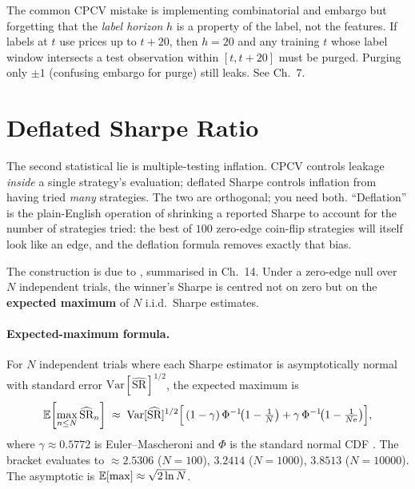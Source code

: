\begin{pitfallbox}
The common CPCV mistake is implementing combinatorial and embargo
but forgetting that the \emph{label horizon} $h$ is a property of
the label, not the features. If labels at $t$ use prices up to
$t + 20$, then $h = 20$ and any training $t$ whose label window
intersects a test observation within $[t, t+20]$ must be purged.
Purging only $\pm 1$ (confusing embargo for purge) still leaks.
See \citet{lopezdeprado2018afml} Ch.~7.
\end{pitfallbox}

\section{Deflated Sharpe Ratio}
\label{sec:bt_deflated_sharpe}

The second statistical lie is multiple-testing inflation. CPCV
controls leakage \emph{inside} a single strategy's evaluation;
deflated Sharpe controls inflation from having tried \emph{many}
strategies. The two are orthogonal; you need both. ``Deflation''
is the plain-English operation of shrinking a reported Sharpe to
account for the number of strategies tried: the best of $100$
zero-edge coin-flip strategies will itself look like an edge, and
the deflation formula removes exactly that bias.

The construction is due to \citet{bailey2014deflated}, summarised in
\citeAFML{} Ch.~14. Under a zero-edge null over $N$ independent
trials, the winner's Sharpe is centred not on zero but on the
\textbf{expected maximum} of $N$ i.i.d.\ Sharpe estimates.

\paragraph{Expected-maximum formula.} For $N$ independent trials
where each Sharpe estimator is asymptotically normal with standard
error $\text{Var}[\widehat{\text{SR}}]^{1/2}$, the expected
maximum is
\begin{equation}
\mathbb{E}\!\left[\max_{n \leq N} \widehat{\text{SR}}_n\right]
  \;\approx\;
  \text{Var}[\widehat{\text{SR}}]^{1/2}
  \Bigl[\,(1 - \gamma)\,\Phi^{-1}\!\bigl(1 - \tfrac{1}{N}\bigr)
       + \gamma\,\Phi^{-1}\!\bigl(1 - \tfrac{1}{N\mathrm{e}}\bigr)\Bigr],
  \label{eq:dsr_emax}
\end{equation}
where $\gamma \approx 0.5772$ is Euler--Mascheroni and $\Phi$ is the
standard normal CDF \citep{bailey2014deflated}. The bracket evaluates
to $\approx 2.5306$ ($N=100$), $3.2414$ ($N=1000$), $3.8513$
($N=10000$). The asymptotic is $\mathbb{E}[\max] \approx \sqrt{2 \ln N}$.

